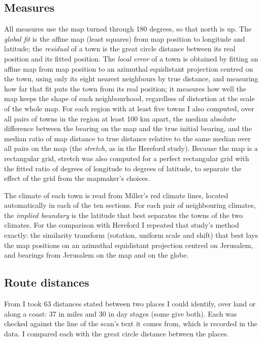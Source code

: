 \documentclass[11pt,a4paper]{article}
\begin{document}
\subsection{Measures}
All measures use the map turned through 180 degrees, so that north is up. The \textit{global fit} is the affine map (least squares) from map position to longitude and latitude; the \textit{residual} of a town is the great circle distance between its real position and its fitted position. The \textit{local error} of a town is obtained by fitting an affine map from map position to an azimuthal equidistant projection centred on the town, using only its eight nearest neighbours by true distance, and measuring how far that fit puts the town from its real position; it measures how well the map keeps the shape of each neighbourhood, regardless of distortion at the scale of the whole map. For each region with at least five towns I also computed, over all pairs of towns in the region at least 100 km apart, the median absolute difference between the bearing on the map and the true initial bearing, and the median ratio of map distance to true distance relative to the same median over all pairs on the map (the \textit{stretch}, as in the Hereford study). Because the map is a rectangular grid, stretch was also computed for a perfect rectangular grid with the fitted ratio of degrees of longitude to degrees of latitude, to separate the effect of the grid from the mapmaker's choices.

The climate of each town is read from Miller's red climate lines, located automatically in each of the ten sections. For each pair of neighbouring climates, the \textit{implied boundary} is the latitude that best separates the towns of the two climates. For the comparison with Hereford I repeated that study's method exactly: the similarity transform (rotation, uniform scale and shift) that best lays the map positions on an azimuthal equidistant projection centred on Jerusalem, and bearings from Jerusalem on the map and on the globe.

\subsection{Route distances}
From \citet{dozy} I took 63 distances stated between two places I could identify, over land or along a coast: 37 in miles and 30 in day stages (some give both). Each was checked against the line of the scan's text it comes from, which is recorded in the data. I compared each with the great circle distance between the places.
\end{document}
